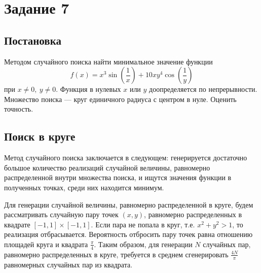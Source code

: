 \documentclass[12pt, a4paper]{article}
\begin{document}
\section{Задание 7}
\subsection{Постановка}
	Методом случайного поиска найти минимальное значение функции 
	\[ f(x)= x^3\sin\left( \frac 1{x} \right) + 10xy^4\cos\left( \frac 1 {y} \right) \]
	при $x\neq 0,\ y\neq 0$. Функция в нулевых $x$ или $y$ доопределяется по непрерывности.
	Множество поиска --- круг единичного радиуса с центром в нуле. Оценить точность.
\subsection{Поиск в круге}
Метод случайного поиска заключается в следующем: генерируется достаточно большое количество реализаций случайной величины, равномерно распределенной внутри множества поиска, и ищутся значения функции в полученных точках, среди них находится минимум.

Для генерации случайной величины, равномерно распределенной в круге, будем рассматривать случайную пару точек $(x,y)$, равномерно распределенных в квадрате $[-1,1]\times [-1,1]$. Если пара не попала в круг, т.е. $x^2+y^2>1$, то реализация отбрасывается. Вероятность отбросить пару точек равна отношению площадей круга и квадрата $\frac{\pi}{4}$. Таким образом, для генерации $N$ случайных пар, равномерно распределенных в круге, требуется в среднем сгенерировать $\frac{4N}{\pi}$ равномерных случайных пар из квадрата. 
\end{document}
